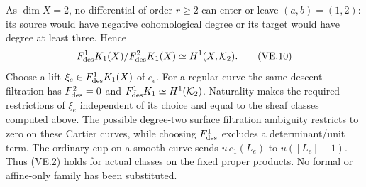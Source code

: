 As $\dim X=2$, no differential of order $r\ge2$ can enter or leave
$(a,b)=(1,2)$: its source would have negative cohomological degree
or its target would have degree at least three. Hence
\begin{equation}
 F^1_{\rm des}K_1(X)/F^2_{\rm des}K_1(X)
                              \simeq H^1(X,\mathcal K_2).
                                                               \tag{VE.10}
\end{equation}
Choose a lift $\xi_e\in F^1_{\rm des}K_1(X)$ of $c_e$.
For a regular curve the same descent filtration has $F^2_{\rm des}=0$
and $F^1_{\rm des}K_1\simeq H^1(\mathcal K_2)$.
Naturality makes the required restrictions of $\xi_e$ independent
of its choice and equal to the sheaf classes computed above.
The possible degree-two surface filtration ambiguity restricts
to zero on these Cartier curves, while choosing $F^1_{\rm des}$
excludes a determinant/unit term.
The ordinary cup on a smooth curve sends $u\,c_1(L_e)$ to
$u([L_e]-1)$. Thus (VE.2) holds for actual classes on the fixed
proper products. No formal or affine-only family has been substituted.




